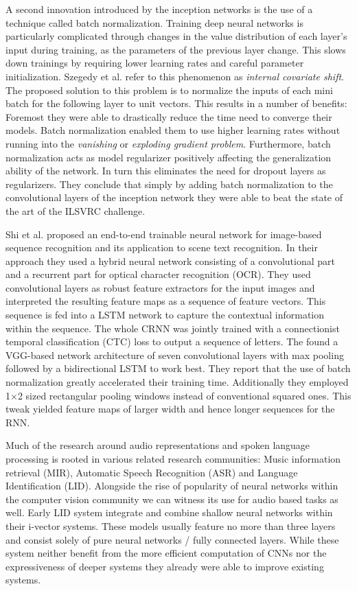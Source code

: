 A second innovation introduced by the inception networks is the use of a technique called batch normalization\cite{ioffe2015batch}. Training deep neural networks is particularly complicated through changes in the value distribution of each layer's input during training, as the parameters of the previous layer change. This slows down trainings by requiring lower learning rates and careful parameter initialization. Szegedy et al. refer to this phenomenon as \emph{internal covariate shift}. The proposed solution to this problem is to normalize the inputs of each mini batch for the following layer to unit vectors. This results in a number of benefits: Foremost they were able to drastically reduce the time need to converge their models. Batch normalization enabled them to use higher learning rates without running into the \emph{vanishing} or \emph{exploding gradient problem}. Furthermore, batch normalization acts as model regularizer positively affecting the generalization ability of the network. In turn this eliminates the need for dropout layers as regularizers. They conclude that simply by adding batch normalization to the convolutional layers of the inception network they were able to beat the state of the art of the ILSVRC challenge.

Shi et al.\cite{shi2016end} proposed an end-to-end trainable neural network for image-based sequence recognition and its application to scene text recognition. In their approach they used a hybrid neural network consisting of a convolutional part and a recurrent part for optical character recognition (OCR). They used convolutional layers as robust feature extractors for the input images and interpreted the resulting feature maps as a sequence of feature vectors. This sequence is fed into a LSTM network to capture the contextual information within the sequence. The whole CRNN was jointly trained with a connectionist temporal classification (CTC) loss \cite{graves2006connectionist} to output a sequence of letters. The found a VGG-based network architecture of seven convolutional layers with max pooling followed by a bidirectional LSTM to work best. They report that the use of batch normalization greatly accelerated their training time. Additionally they employed 1$\times$2 sized rectangular pooling windows instead of conventional squared ones. This tweak yielded feature maps of larger width and hence longer sequences for the RNN.


Much of the research around audio representations and spoken language processing is rooted in various related research communities: Music information retrieval (MIR), Automatic Speech Recognition (ASR) and Language Identification (LID). Alongside the rise of popularity of neural networks within the computer vision community we can witness its use for audio based tasks as well. Early LID system integrate and combine shallow neural networks within their i-vector systems\cite{gonzalez2014automatic, han2013trap, matejka2014neural, richardson2015unified}. These models usually feature no more than three layers and consist solely of pure neural networks / fully connected layers. While these system neither benefit from the more efficient computation of CNNs nor the expressiveness of deeper systems they already were able to improve existing systems.

